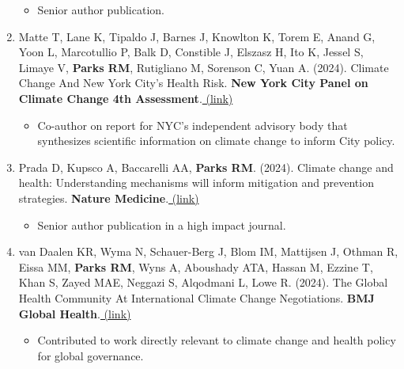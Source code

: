 \begin{enumerate}
    \begin{itemize}
        \item Senior author publication.
    \end{itemize}

    \item \noindent Matte T, Lane K, Tipaldo J, Barnes J, Knowlton K, Torem E, Anand G, Yoon L, Marcotullio P, Balk D, Constible J, Elszasz H, Ito K, Jessel S, Limaye V, \textbf{Parks RM}, Rutigliano M, Sorenson C, Yuan A. (2024). Climate Change And New York City’s Health Risk. \textbf{New York City Panel on Climate Change 4th Assessment}.\href{https://nyaspubs.onlinelibrary.wiley.com/doi/full/10.1111/nyas.15115}{ (link)}

    \begin{itemize}
        \item Co-author on report for NYC's independent advisory body that synthesizes scientific information on climate change to inform City policy.
    \end{itemize}
    
    \item \noindent Prada D, Kupsco A, Baccarelli AA, \textbf{Parks RM}. (2024). Climate change and health: Understanding mechanisms will inform mitigation and prevention strategies. \textbf{Nature Medicine}.\href{https://www.nature.com/articles/s41591-024-02925-8}{ (link)}

    \begin{itemize}
        \item Senior author publication in a high impact journal.
    \end{itemize}

    \item van Daalen KR, Wyma N, Schauer-Berg J, Blom IM, Mattijsen J, Othman R, Eissa MM, \textbf{Parks RM}, Wyns A, Aboushady ATA, Hassan M, Ezzine T, Khan S, Zayed MAE, Neggazi S, Alqodmani L, Lowe R. (2024). The Global Health Community At International Climate Change Negotiations. \textbf{BMJ Global Health}.\href{https://gh.bmj.com/content/9/4/e015292}{ (link)}

    \begin{itemize}
        \item Contributed to work directly relevant to climate change and health policy for global governance.
    \end{itemize}


\end{enumerate}
